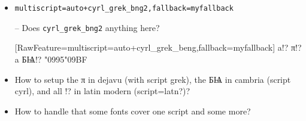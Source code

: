 \documentclass{article}
\begin{document}
\begin{itemize}
[RawFeature={fallback=mycyrlfallback}]
a!? π!? a БѨ!? \char"0995\char"09BF

\item \verb!multiscript=auto+cyrl_grek_bng2,fallback=myfallback!

-- Does \verb+cyrl_grek_bng2+ anything here?

[RawFeature={multiscript=auto+cyrl_grek_beng,fallback=myfallback}]
a!? π!? a БѨ!? \char"0995\char"09BF


\item How to setup the π in dejavu (with script grek), the БѨ in cambria (script cyrl), and all !? in latin modern (script=latn?)?
    
\item How to handle that some fonts cover one script and some more?
\end{itemize}
\end{document}

